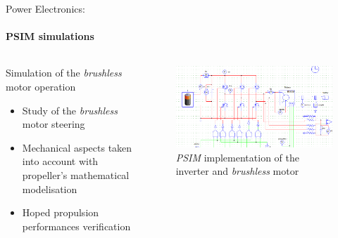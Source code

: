\documentclass{beamer}
\begin{document}
	\begin{frame}{Power Electronics:}
		\framesubtitle{PSIM simulations}
		\begin{columns}[T]
	  		\begin{column}{0.5\textwidth}
				Simulation of the \textit{brushless} motor operation
				\begin{itemize}
					\item Study of the \textit{brushless} motor steering
					\item Mechanical aspects taken into account with propeller's mathematical modelisation
					\item Hoped propulsion performances verification
				\end{itemize}
	  		\end{column}
	  		\begin{column}{0.5\textwidth}
	  			\begin{figure}
	  				\begin{center}
	  					\includegraphics[height=0.35\textheight]{../Illus/simu_bldcm.png}
	  				\end{center}
	    			\caption{\textit{PSIM} implementation of the inverter and \textit{brushless} motor}
	    		\end{figure}
	  		\end{column}
		\end{columns}
	\end{frame}	
	
\end{document}
